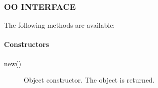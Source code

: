 \subsubsection*{OO INTERFACE\label{ORAC::Print_OO_INTERFACE}}

The following methods are available:

\paragraph*{Constructors\label{ORAC::Print_Constructors}}\begin{description}
\item[new()] \mbox{}

Object constructor. The object is returned.

\end{description}
